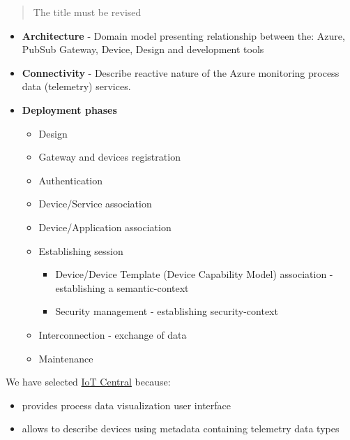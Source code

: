 \documentclass{article}
\providecommand{\tightlist} { \setlength{\itemsep}{0pt}\setlength{\parskip}{0pt}}
\begin{document}
\begin{quote}
  The title must be revised
\end{quote}

\begin{itemize}
  \tightlist
  \item
        \textbf{Architecture} - Domain model presenting relationship between
        the: Azure, PubSub Gateway, Device, Design and development tools
  \item
        \textbf{Connectivity} - Describe reactive nature of the Azure
        monitoring process data (telemetry) services.
  \item
        \textbf{Deployment phases}

        \begin{itemize}
          \tightlist
          \item
                Design
          \item
                Gateway and devices registration
          \item
                Authentication
          \item
                Device/Service association
          \item
                Device/Application association
          \item
                Establishing session

                \begin{itemize}
                  \tightlist
                  \item
                        Device/Device Template (Device Capability Model) association -
                        establishing a semantic-context
                  \item
                        Security management - establishing security-context
                \end{itemize}
          \item
                Interconnection - exchange of data
          \item
                Maintenance
        \end{itemize}
\end{itemize}

We have selected
\href{https://docs.microsoft.com/azure/iot-central/core/}{IoT Central}
because:

\begin{itemize}
  \tightlist
  \item
        provides process data visualization user interface
  \item
        allows to describe devices using metadata containing telemetry data
        types
\end{itemize}
\end{document}
